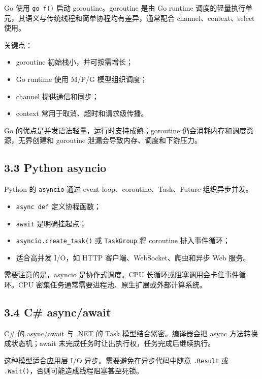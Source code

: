 \documentclass[
  11pt,
  a4paper,
]{article}
\providecommand{\tightlist}{%
  \setlength{\itemsep}{0pt}\setlength{\parskip}{0pt}}
\begin{document}
Go 使用 \texttt{go\ f()} 启动 goroutine。goroutine 是由 Go runtime
调度的轻量执行单元，其语义与传统线程和简单协程均有差异，通常配合
channel、context、select 使用。

关键点：

\begin{itemize}
\tightlist
\item
  goroutine 初始栈小，并可按需增长；
\item
  Go runtime 使用 M/P/G 模型组织调度；
\item
  channel 提供通信和同步；
\item
  context 常用于取消、超时和请求级传播。
\end{itemize}

Go 的优点是并发语法轻量，运行时支持成熟；goroutine
仍会消耗内存和调度资源，无界创建和 goroutine
泄漏会导致内存、调度和下游压力。

\subsection{3.3 Python asyncio}\label{python-asyncio}

Python 的 \texttt{asyncio} 通过 event loop、coroutine、Task、Future
组织异步并发。

\begin{itemize}
\tightlist
\item
  \texttt{async\ def} 定义协程函数；
\item
  \texttt{await} 是明确挂起点；
\item
  \texttt{asyncio.create\_task()} 或 \texttt{TaskGroup} 将 coroutine
  排入事件循环；
\item
  适合高并发 I/O，如 HTTP 客户端、WebSocket、爬虫和异步 Web 服务。
\end{itemize}

需要注意的是，asyncio 是协作式调度。CPU
长循环或阻塞调用会卡住事件循环。CPU
密集任务通常需要进程池、原生扩展或外部计算系统。

\subsection{3.4 C\# async/await}\label{c-asyncawait}

C\# 的 async/await 与 .NET 的 Task 模型结合紧密。编译器会把 async
方法转换成状态机；await 未完成任务时让出执行权，任务完成后继续执行。

这种模型适合应用层 I/O 异步。需要避免在异步代码中随意 \texttt{.Result}
或 \texttt{.Wait()}，否则可能造成线程阻塞甚至死锁。
\end{document}
